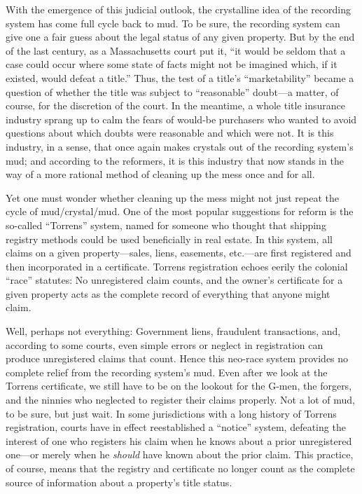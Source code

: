 With the emergence of this judicial outlook, the crystalline idea of the
recording system has come full cycle back to mud. To be sure, the recording
system can give one a fair guess about the legal status of any given property.
But by the end of the last century, as a Massachusetts court put it, ``it would
be seldom that a case could occur where some state of facts might not be
imagined which, if it existed, would defeat a title.'' Thus, the test of a
title's ``marketability'' became a question of whether the title was subject to
``reasonable'' doubt---a matter, of course, for the discretion of the court. In
the meantime, a whole title insurance industry sprang up to calm the fears of
would-be purchasers who wanted to avoid questions about which doubts were
reasonable and which were not. It is this industry, in a sense, that once again
makes crystals out of the recording system's mud; and according to the
reformers, it is this industry that now stands in the way of a more rational
method of cleaning up the mess once and for all. 

Yet one must wonder whether cleaning up the mess might not just repeat the cycle
of mud/crystal/mud. One of the most popular suggestions for reform is the
so-called ``Torrens'' system, named for someone who thought that shipping
registry methods could be used beneficially in real estate. In this system, all
claims on a given property---sales, liens, easements, etc.---are first
registered and then incorporated in a certificate. Torrens registration echoes
eerily the colonial ``race'' statutes: No unregistered claim counts, and the
owner's certificate for a given property acts as the complete record of
everything that anyone might claim.

Well, perhaps not everything: Government liens, fraudulent transactions, and,
according to some courts, even simple errors or neglect in registration can
produce unregistered claims that count. Hence this neo-race system provides no
complete relief from the recording system's mud. Even after we look at the
Torrens certificate, we still have to be on the lookout for the G-men, the
forgers, and the ninnies who neglected to register their claims properly. Not a
lot of mud, to be sure, but just wait. In some jurisdictions with a long
history of Torrens registration, courts have in effect reestablished a
``notice''
system, defeating the interest of one who registers his claim when he knows
about a prior unregistered one---or merely when he \textit{should} have known
about the prior claim. This practice, of course, means that the registry and
certificate no longer count as the complete source of information about a
property's title status.

